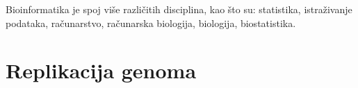 \noindent Bioinformatika je spoj više različitih disciplina, kao što su:
statistika, istraživanje podataka, računarstvo, računarska biologija, biologija, biostatistika.

\section{Replikacija genoma}
\label{sec:replikacija}

